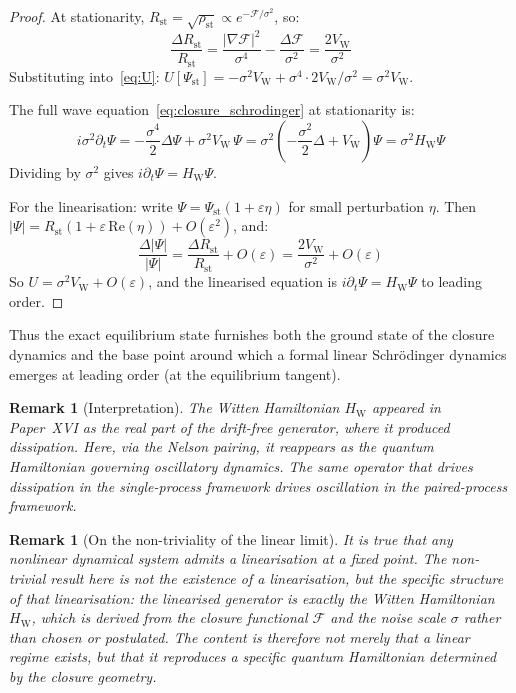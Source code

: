 \documentclass[12pt]{article}
\newtheorem{remark}[theorem]{Remark}
\newcommand{\Fcal}{\mathcal{F}}
\newcommand{\VW}{V_{\mathrm{W}}}
\begin{document}
\begin{proof}
At stationarity, $R_{\mathrm{st}} = \sqrt{\rho_{\mathrm{st}}} \propto e^{-\Fcal/\sigma^2}$, so:
\begin{equation}
    \frac{\Delta R_{\mathrm{st}}}{R_{\mathrm{st}}} = \frac{|\nabla\Fcal|^2}{\sigma^4} - \frac{\Delta\Fcal}{\sigma^2} = \frac{2\VW}{\sigma^2}
\end{equation}
Substituting into~\eqref{eq:U}: $U[\Psi_{\mathrm{st}}] = -\sigma^2\VW + \sigma^4 \cdot 2\VW/\sigma^2 = \sigma^2\VW$.

The full wave equation~\eqref{eq:closure_schrodinger} at stationarity is:
\begin{equation}
    i\sigma^2\partial_t\Psi = -\frac{\sigma^4}{2}\Delta\Psi + \sigma^2\VW\,\Psi = \sigma^2\!\left(-\frac{\sigma^2}{2}\Delta + \VW\right)\!\Psi = \sigma^2 H_{\mathrm{W}}\Psi
\end{equation}
Dividing by $\sigma^2$ gives $i\partial_t\Psi = H_{\mathrm{W}}\Psi$.

For the linearisation: write $\Psi = \Psi_{\mathrm{st}}(1 + \varepsilon\eta)$ for small perturbation $\eta$. Then $|\Psi| = R_{\mathrm{st}}(1 + \varepsilon\,\mathrm{Re}(\eta)) + O(\varepsilon^2)$, and:
\begin{equation}
    \frac{\Delta|\Psi|}{|\Psi|} = \frac{\Delta R_{\mathrm{st}}}{R_{\mathrm{st}}} + O(\varepsilon) = \frac{2\VW}{\sigma^2} + O(\varepsilon)
\end{equation}
So $U = \sigma^2\VW + O(\varepsilon)$, and the linearised equation is $i\partial_t\Psi = H_{\mathrm{W}}\Psi$ to leading order.
\end{proof}

Thus the exact equilibrium state furnishes both the ground state of the closure dynamics and the base point around which a formal linear Schr\"odinger dynamics emerges at leading order (at the equilibrium tangent).

\begin{remark}[Interpretation]
The Witten Hamiltonian $H_{\mathrm{W}}$ appeared in Paper~XVI as the \textit{real part} of the drift-free generator, where it produced dissipation. Here, via the Nelson pairing, it reappears as the \textit{quantum Hamiltonian} governing oscillatory dynamics. The same operator that drives dissipation in the single-process framework drives oscillation in the paired-process framework.
\end{remark}

\begin{remark}[On the non-triviality of the linear limit]
It is true that any nonlinear dynamical system admits a linearisation at a fixed point. The non-trivial result here is not the existence of a linearisation, but the specific structure of that linearisation: the linearised generator is exactly the Witten Hamiltonian $H_{\mathrm{W}}$, which is derived from the closure functional $\Fcal$ and the noise scale $\sigma$ rather than chosen or postulated. The content is therefore not merely that a linear regime exists, but that it reproduces a specific quantum Hamiltonian determined by the closure geometry.
\end{remark}
\end{document}
